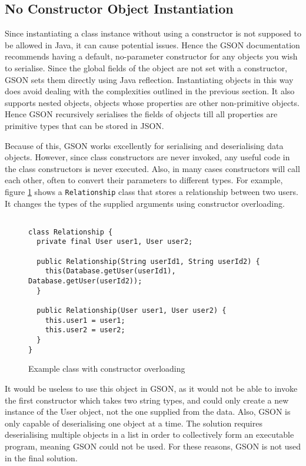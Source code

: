 \subsection{No Constructor Object Instantiation}
Since instantiating a class instance without using a constructor is not supposed to be allowed in Java, it can cause potential issues. Hence the GSON documentation recommends having a default, no-parameter constructor for any objects you wish to serialise. Since the global fields of the object are not set with a constructor, GSON sets them directly using Java reflection. Instantiating objects in this way does avoid dealing with the complexities outlined in the previous section. It also supports nested objects, objects whose properties are other non-primitive objects. Hence GSON recursively serialises the fields of objects till all properties are primitive types that can be stored in JSON.\par
Because of this, GSON works excellently for serialising and deserialising data objects. However, since class constructors are never invoked, any useful code in the class constructors is never executed. Also, in many cases constructors will call each other, often to convert their parameters to different types. For example, figure \ref{fig:constructor_overloading} shows a \texttt{Relationship} class that stores a relationship between two users. It changes the types of the supplied arguments using constructor overloading.\par
\begin{figure}
\caption{Example class with constructor overloading}
\label{fig:constructor_overloading}
\begin{verbatim}

class Relationship {
  private final User user1, User user2;

  public Relationship(String userId1, String userId2) {
    this(Database.getUser(userId1), Database.getUser(userId2));
  }

  public Relationship(User user1, User user2) {
    this.user1 = user1;
    this.user2 = user2;
  }
}
\end{verbatim}
\end{figure}
It would be useless to use this object in GSON, as it would not be able to invoke the first constructor which takes two string types, and could only create a new instance of the User object, not the one supplied from the data. Also, GSON is only capable of deserialising one object at a time. The solution requires deserialising multiple objects in a list in order to collectively form an executable program, meaning GSON could not be used. For these reasons, GSON is not used in the final solution.

